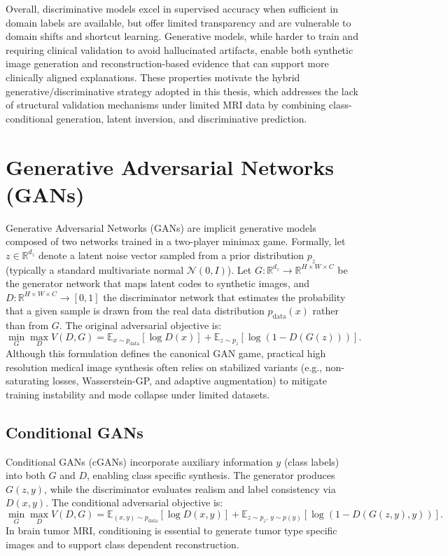 \noindent
Overall, discriminative models excel in supervised accuracy when sufficient in domain labels are available, but offer limited transparency and are vulnerable to domain shifts and shortcut learning. Generative models, while harder to train and requiring clinical validation to avoid hallucinated artifacts, enable both synthetic image generation and reconstruction-based evidence that can support more clinically aligned explanations. These properties motivate the hybrid generative/discriminative strategy adopted in this thesis, which addresses the lack of structural validation mechanisms under limited MRI data by combining class-conditional generation, latent inversion, and discriminative prediction.

\section{Generative Adversarial Networks (GANs)}

Generative Adversarial Networks (GANs) \cite{goodfellow2014generativeadversarialnetworks} are implicit generative models composed of two networks trained in a two-player minimax game. Formally, let $z \in \mathbb{R}^{d_z}$ denote a latent noise vector sampled from a prior distribution $p_z$ (typically a standard multivariate normal $\mathcal{N}(0, I)$). Let $G: \mathbb{R}^{d_z} \rightarrow \mathbb{R}^{H \times W \times C}$ be the generator network that maps latent codes to synthetic images, and $D: \mathbb{R}^{H \times W \times C} \rightarrow [0,1]$ the discriminator network that estimates the probability that a given sample is drawn from the real data distribution $p_{\text{data}}(x)$ rather than from $G$. The original adversarial objective is:
\begin{equation}
\min_G \max_D V(D,G)=
\mathbb{E}_{x\sim p_{\text{data}}}[\log D(x)] +
\mathbb{E}_{z\sim p_z}[\log(1-D(G(z)))].
\end{equation}
Although this formulation defines the canonical GAN game, practical high resolution medical image synthesis often relies on stabilized variants (e.g., non-saturating losses, Wasserstein-GP, and adaptive augmentation) to mitigate training instability and mode collapse under limited datasets.

\subsection{Conditional GANs}

Conditional GANs (cGANs) \cite{mirza2014conditionalgenerativeadversarialnets} incorporate auxiliary information $y$ (class labels) into both $G$ and $D$, enabling class specific synthesis. The generator produces $G(z,y)$, while the discriminator evaluates realism and label consistency via $D(x,y)$. The conditional adversarial objective is:
\begin{equation}
\min_G \max_D V(D,G)=
\mathbb{E}_{(x,y)\sim p_{\text{data}}}[\log D(x,y)] +
\mathbb{E}_{z\sim p_z,\, y\sim p(y)}[\log(1-D(G(z,y),y))].
\end{equation}
In brain tumor MRI, conditioning is essential to generate tumor type specific images and to support class dependent reconstruction.



